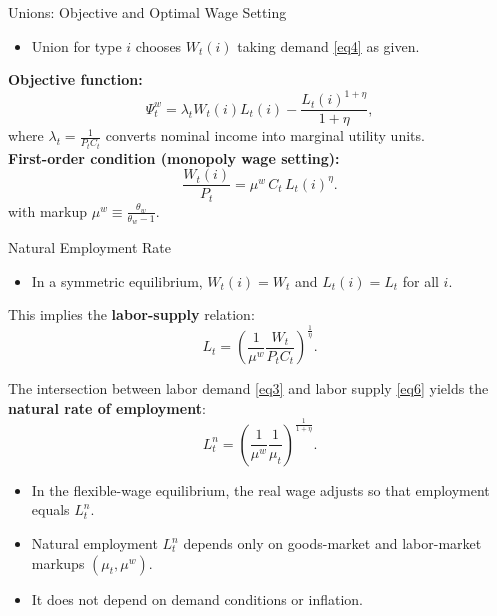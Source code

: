 \documentclass[11pt,aspectratio=169]{beamer}
\begin{document}
\begin{frame}{Unions: Objective and Optimal Wage Setting}
\begin{itemize}
    \item Union for type $i$ chooses $W_t(i)$ taking demand \eqref{eq4} as given.
\end{itemize}
\textbf{Objective function:}
\begin{equation}
\Psi _{t}^{w}=\lambda _{t}W_{t}(i)L_{t}(i)-\frac{L_{t}(i)^{1+\eta }}{1+\eta },
\label{eq5}
\end{equation}
where $\lambda_t=\frac{1}{P_t C_t}$ converts nominal income into marginal utility units. \\
\vspace{1em}
\textbf{First-order condition (monopoly wage setting):}
\[
\frac{W_t(i)}{P_t}=\mu^w\,C_t\,L_t(i)^\eta.
\]
with markup $\mu^w\equiv \frac{\theta_w}{\theta_w-1}.$
\end{frame}

\begin{frame}{Natural Employment Rate}
\small
\begin{itemize}
    \item In a symmetric equilibrium, \(W_t(i)=W_t\) and \(L_t(i)=L_t\) for all \(i\).
\end{itemize}

This implies the \textbf{labor-supply} relation:
\begin{equation}
L_{t}=\left( \frac{1}{\mu ^{w}}\frac{W_{t}}{P_{t}C_{t}}\right) ^{\frac{1}{\eta }}.
\label{eq6}
\end{equation}

The intersection between labor demand \eqref{eq3} and labor supply \eqref{eq6} yields the \textbf{natural rate of employment}:
\[
L_t^n=\left(\frac{1}{\mu^w}\frac{1}{\mu_t}\right)^{\frac{1}{1+\eta}}.
\]

\begin{itemize}
    \item In the flexible-wage equilibrium, the real wage adjusts so that employment equals \(L_t^n\).
    \item Natural employment \(L_t^n\) depends only on goods-market and labor-market markups \((\mu_t,\mu^w)\).
    \item It does not depend on demand conditions or inflation.
\end{itemize}
\end{frame}
\end{document}
